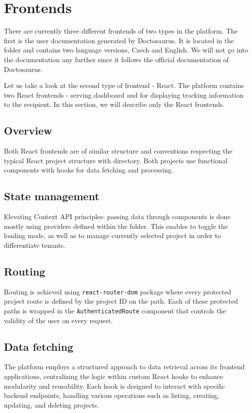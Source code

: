 \section{Frontends}
\label{attachments:programming-platform.frontend}
There are currently three different frontends of two types in the platform.
The first is the user documentation generated by Doctosaurus.
It is located in the  folder and contains two language versions, Czech and English.
We will not go into the documentation any further since it follows the official documentation of Doctosaurus.

Let us take a look at the second type of frontend - React.
The platform contains two React frontends -  serving dashboard and  for displaying tracking information to the recipient.
In this section, we will describe only the React frontends.

\subsection{Overview}
Both React frontends are of similar structure and conventions respecting the typical React project structure with  directory.
Both projects use functional components with hooks for data fetching and processing.

\subsection{State management}
Elevating Context API principles: passing data through components is done mostly using providers defined within the  folder. 
This enables to toggle the loading mode, as well as to manage currently selected project in order to differentiate tenants.

\subsection{Routing}
Routing is achieved using \texttt{react-router-dom} package where every protected project route is defined by the project ID on the path. 
Each of these protected paths is wrapped in the \texttt{AuthenticatedRoute} component that controls the validity of the user on every request.

\subsection{Data fetching}
The platform employs a structured approach to data retrieval across its frontend applications, centralizing the logic within custom React hooks to enhance modularity and reusability. 
Each hook is designed to interact with specific backend endpoints, handling various operations such as listing, creating, updating, and deleting projects. 

